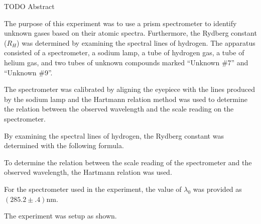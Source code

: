 
\physics

\begin{paperabs}
TODO Abstract
\end{paperabs}

\begin{paper}

The purpose of this experiment was to use a prism spectrometer to identify
unknown gases based on their atomic spectra.
Furthermore, the Rydberg constant ($R_H$) was determined by examining the
spectral lines of hydrogen.
The apparatus consisted of a spectrometer, a sodium lamp, a tube of hydrogen
gas, a tube of helium gas, and two tubes of unknown compounds marked ``Unknown
\#7'' and ``Unknown \#9''.

The spectrometer was calibrated by aligning the eyepiece with the lines produced
by the sodium lamp and the Hartmann relation method was used to determine the
relation between the observed wavelength and the scale reading on the
spectrometer.

By examining the spectral lines of hydrogen, the Rydberg constant was
determined with the following formula.

\begin{paperwhere}
\end{paperwhere}

To determine the relation between the scale reading of the spectrometer and the
observed wavelength, the Hartmann relation was used.

\begin{paperwhere}
\end{paperwhere}

For the spectrometer used in the experiment, the value of $\lambda_0$ was
provided as $(285.2\pm.4)\si{\nano\meter}$.

The experiment was setup as shown.


\end{paper}
